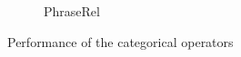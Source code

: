 \begin{figure}[b]
\begin{subfigure}[t]{0.9\textwidth}
  \caption{PhraseRel}
  \label{fig:frobenius-phraserel-plot}
  \end{subfigure}

  \caption{Performance of the categorical operators}
  \label{fig:frobenius-results}
\end{figure}
